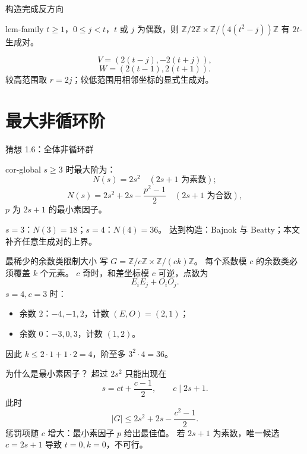 \documentclass{beamer}
\begin{document}
\begin{frame}{构造完成反方向}
\begin{bookresult}{lem-family}
$t\ge1$，$0\le j<t$，$t$ 或 $j$ 为偶数，则
$\mathbb Z/2\mathbb Z\times\mathbb Z/(4(t^2-j))\mathbb Z$
有 $2t$-生成对。
\end{bookresult}
\[V=(2(t-j),-2(t+j)),\]
\[W=(2(t-1),2(t+1)).\]
较高范围取 $r=2j$；较低范围用相邻坐标的显式生成对。
\end{frame}
\section{最大非循环阶}
\begin{frame}{猜想 1.6：全体非循环群}
\begin{bookresult}{cor-global}
$s\ge3$ 时最大阶为：
\[N(s)=2s^2\quad (2s+1\text{ 为素数});\]
\[N(s)=2s^2+2s-\frac{p^2-1}{2}\quad (2s+1\text{ 为合数}),\]
$p$ 为 $2s+1$ 的最小素因子。
\end{bookresult}
$s=3$：$N(3)=18$；\quad $s=4$：$N(4)=36$。
\medskip
达到构造：Bajnok 与 Beatty；本文补齐任意生成对的上界。
\end{frame}
\begin{frame}{最稀少的余数类限制大小}
写 $G=\mathbb Z/c\mathbb Z\times\mathbb Z/(ck)\mathbb Z$。
每个系数模 $c$ 的余数类必须覆盖 $k$ 个元素。
\medskip
$c$ 奇时，和差坐标模 $c$ 可逆，点数为
\[E_iE_j+O_iO_j.\]
$s=4,c=3$ 时：
\begin{itemize}
\item 余数 $2$：$-4,-1,2$，计数 $(E,O)=(2,1)$；
\item 余数 $0$：$-3,0,3$，计数 $(1,2)$。
\end{itemize}
因此 $k\le2\cdot1+1\cdot2=4$，阶至多 $3^2\cdot4=36$。
\end{frame}
\begin{frame}{为什么是最小素因子？}
超过 $2s^2$ 只能出现在
\[s=ct+\frac{c-1}{2},\qquad c\mid2s+1.\]
此时
\[|G|\le2s^2+2s-\frac{c^2-1}{2}.\]
惩罚项随 $c$ 增大：最小素因子 $p$ 给出最佳值。
\medskip
若 $2s+1$ 为素数，唯一候选 $c=2s+1$ 导致 $t=0,k=0$，不可行。
\end{frame}
\end{document}

